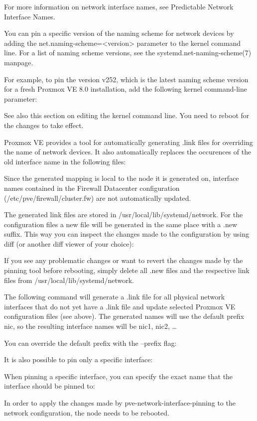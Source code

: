 For more information on network interface names, see Predictable Network Interface Names.

You can pin a specific version of the naming scheme for network devices by adding the net.naming-scheme=<version> parameter to the kernel command line. For a list of naming scheme versions, see the systemd.net-naming-scheme(7) manpage.

For example, to pin the version v252, which is the latest naming scheme version for a fresh Proxmox VE 8.0 installation, add the following kernel command-line parameter:

See also this section on editing the kernel command line. You need to reboot for the changes to take effect.

Proxmox VE provides a tool for automatically generating .link files for overriding the name of network devices. It also automatically replaces the occurences of the old interface name in the following files:

Since the generated mapping is local to the node it is generated on, interface names contained in the Firewall Datacenter configuration (/etc/pve/firewall/cluster.fw) are not automatically updated.

The generated link files are stored in /usr/local/lib/systemd/network. For the configuration files a new file will be generated in the same place with a .new suffix. This way you can inspect the changes made to the configuration by using diff (or another diff viewer of your choice):

If you see any problematic changes or want to revert the changes made by the pinning tool before rebooting, simply delete all .new files and the respective link files from /usr/local/lib/systemd/network.

The following command will generate a .link file for all physical network interfaces that do not yet have a .link file and update selected Proxmox VE configuration files (see above). The generated names will use the default prefix nic, so the resulting interface names will be nic1, nic2, …

You can override the default prefix with the --prefix flag:

It is also possible to pin only a specific interface:

When pinning a specific interface, you can specify the exact name that the interface should be pinned to:

In order to apply the changes made by pve-network-interface-pinning to the network configuration, the node needs to be rebooted.

